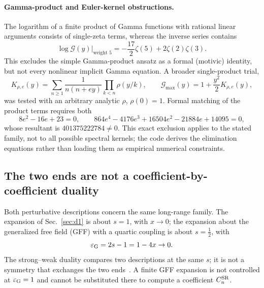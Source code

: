 \documentclass[11pt,a4paper]{article}
\numberwithin{equation}{section}
\newcommand{\CSR}{C^{\rm SR}}
\begin{document}
\paragraph{Gamma-product and Euler-kernel obstructions.} The logarithm of a finite product of Gamma functions with
rational linear arguments consists of single-zeta terms, whereas the inverse series contains
\begin{equation}
 [y^5]\log\mathcal G(y)\big|_{\text{weight }5}=-\frac{17}{2}\zeta(5)+2\zeta(2)\zeta(3).
\end{equation}
This excludes the simple Gamma-product ansatz as a formal (motivic) identity, but not every nonlinear implicit Gamma
equation. A broader single-product trial,
\begin{equation}
 K_{\rho,e}(y)=\sum_{n\ge1}\frac1{n(n+ey)}\prod_{k<n}\rho(y/k),\qquad
 \mathcal G_{\max}(y)=1+\frac{y^2}{2}K_{\rho,e}(y),
\end{equation}
was tested with an arbitrary analytic $\rho$, $\rho(0)=1$. Formal matching of the product terms requires both
\begin{equation}
 8e^2-16e+23=0,\qquad 864e^4-4176e^3+16504e^2-21884e+14095=0,
\end{equation}
whose resultant is $401375222784\ne0$. This exact exclusion applies to the stated family, not to all possible spectral
kernels; the code derives the elimination equations rather than loading them as empirical numerical constraints.

\subsection{The two ends are not a coefficient-by-coefficient duality}\label{app:dualC:endpoints}
Both perturbative descriptions concern the same long-range family. The expansion of Sec.~\ref{sec:d1} is about $s=1$, with
$x\to0$; the expansion about the generalized free field (GFF) with a quartic coupling is about $s=\frac12$, with
\begin{equation}
 \varepsilon_{\rm G}=2s-1=1-4x\to0 .
\end{equation}
The strong--weak duality compares two descriptions at the same $s$; it is not a symmetry that exchanges the two
ends~\cite{Benedetti:2025nzp}. A finite GFF expansion is not controlled at $\varepsilon_{\rm G}=1$ and cannot be
substituted there to compute a coefficient $\CSR_n$.
\end{document}

